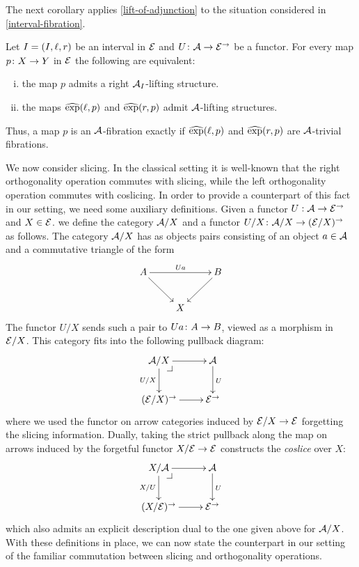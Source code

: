 \documentclass[reqno,10pt,a4paper,oneside]{amsart}
\begin{document}
The next corollary applies \cref{lift-of-adjunction} to the situation considered in \cref{interval-fibration}. 

\begin{corollary} Let $\interval = (\interval, \intervall, \intervalr)$ be an interval in $\catE$ and
 $U \co \cal{A} \to \catE^\to$ be a functor. For every map $p \co X \to Y$ in $\cal{E}$ 
 the following are equivalent: 
\begin{enumerate}[(i)]
\item the map $p$ admits a right $\cal{A}_I$-lifting structure. 
\item the maps $\hatexp(\intervall, p)$ and $\hatexp(\intervalr, p)$ admit $\cal{A}$-lifting structures.
\end{enumerate} 
Thus, a map $p$ is an $\cal{A}$-fibration exactly if $\hatexp(\intervall, p)$ and $\hatexp(\intervalr, p)$ are $\cal{A}$-trivial fibrations.
\end{corollary}


\medskip


We now consider slicing. In the classical setting it is well-known that the right orthogonality operation commutes with slicing, while the left orthogonality operation commutes with coslicing.  In order to provide a counterpart of this fact in our setting, we need some auxiliary definitions. Given a functor $U : \cal{A} \to \catE^{\to}$ and $X \in \catE$.  we define the category $\cal{A}/X$
and a functor $U/X \co \cal{A}/X \to (\cal{E}/X)^\to$ as follows. The category $\cal{A}/X$ has as objects pairs consisting of an object $a \in \cal{A}$ and a commutative triangle of the form
\[
\xymatrix{
A \ar[dr] \ar[rr]^{Ua} & & B  \ar[dl] \\
 & X }
 \]
The functor $U/X$ sends such a pair to $Ua \co A \to B$, viewed as a morphism in $\cal{E}/X$. This category fits into the
following pullback diagram:
\[
\xymatrix{
  \cal{A}/X
  \ar[r]
  \ar[d]_{U/X}
  \pullback{dr}
&
  \cal{A}
  \ar[d]^{U}
\\
  (\catE/X)^{\to}
  \ar[r]
&
  \catE^{\to}
}
\]
where we used the functor on arrow categories induced by $\catE/X \to \catE$ forgetting the slicing information.  Dually, taking the strict pullback along the map on arrows induced by the forgetful functor $X/\cal{E} \to \catE$ constructs the \emph{coslice} over $X$:
\[
\xymatrix{
  X/\cal{A}
  \ar[r]
  \ar[d]_{X/U}
  \pullback{dr}
&
  \cal{A}
  \ar[d]^{U}
\\
  (X/\catE)^{\to}
  \ar[r]
&
  \catE^{\to}
}
\]
which also admits an explicit description dual to the one given above for $\cal{A}/X$. With these definitions in place, we can now state the counterpart in our setting of the familiar commutation between slicing and orthogonality operations. 
\end{document}
